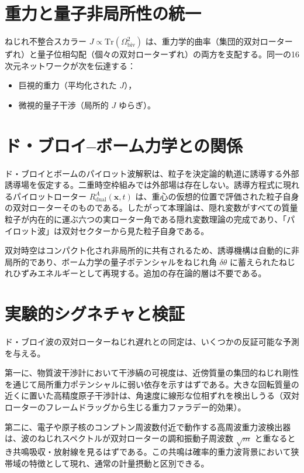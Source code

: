 \documentclass[a4paper]{article}
\begin{document}
\section{重力と量子非局所性の統一}

ねじれ不整合スカラー $J \propto \mathrm{Tr}(\Omega_\text{biv}^2)$ は、重力学的曲率（集団的双対ローターずれ）と量子位相勾配（個々の双対ローターずれ）の両方を支配する。同一の16次元ネットワークが次を伝達する：
\begin{itemize}
\item 巨視的重力（平均化された $J$），
\item 微視的量子干渉（局所的 $J$ ゆらぎ）。
\end{itemize}

\section{ド・ブロイ--ボーム力学との関係}

ド・ブロイとボームのパイロット波解釈は、粒子を決定論的軌道に誘導する外部誘導場を仮定する。二重時空枠組みでは外部場は存在しない。誘導方程式に現れるパイロットローター \(R_{\text{dual}}^{A}(\mathbf{x},t)\) は、重心の仮想的位置で評価された粒子自身の双対ローターそのものである。したがって本理論は、隠れ変数がすべての質量粒子が内在的に運ぶ六つの実ローター角である隠れ変数理論の完成であり、「パイロット波」は双対セクターから見た粒子自身である。

双対時空はコンパクト化され非局所的に共有されるため、誘導機構は自動的に非局所的であり、ボーム力学の量子ポテンシャルをねじれ角 \(\delta\theta\) に蓄えられたねじれひずみエネルギーとして再現する。追加の存在論的層は不要である。

\section{実験的シグネチャと検証}

ド・ブロイ波の双対ローターねじれ遅れとの同定は、いくつかの反証可能な予測を与える。

第一に、物質波干渉計において干渉縞の可視度は、近傍質量の集団的ねじれ剛性を通じて局所重力ポテンシャルに弱い依存を示すはずである。大きな回転質量の近くに置いた高精度原子干渉計は、角速度に線形な位相ずれを検出しうる（双対ローターのフレームドラッグから生じる重力ファラデー的効果）。

第二に、電子や原子核のコンプトン周波数付近で動作する高周波重力波検出器は、波のねじれスペクトルが双対ローターの調和振動子周波数 \(\sqrt{m}\) と重なるとき共鳴吸収・放射線を見るはずである。この共鳴は確率的重力波背景において狭帯域の特徴として現れ、通常の計量摂動と区別できる。
\end{document}
